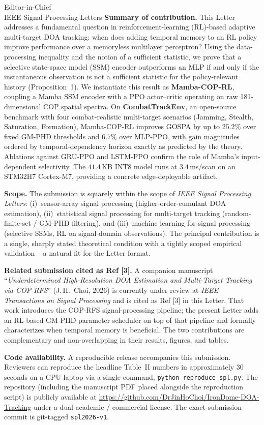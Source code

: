 \documentclass[11pt,a4paper]{letter}
\begin{document}
\begin{letter}{Editor-in-Chief\\
IEEE Signal Processing Letters}
\medskip
\textbf{Summary of contribution.}
This Letter addresses a fundamental question in reinforcement-learning
(RL)-based adaptive multi-target DOA tracking: when does adding
temporal memory to an RL policy improve performance over a memoryless
multilayer perceptron? Using the data-processing inequality and the
notion of a sufficient statistic, we prove that a selective state-space
model (SSM) encoder outperforms an MLP if and only if the instantaneous
observation is not a sufficient statistic for the policy-relevant
history (Proposition~1). We instantiate this result as
\textbf{Mamba-COP-RL}, coupling a Mamba SSM encoder with a PPO
actor--critic operating on raw 181-dimensional COP spatial spectra. On
\textbf{CombatTrackEnv}, an open-source benchmark with four
combat-realistic multi-target scenarios (Jamming, Stealth, Saturation,
Formation), Mamba-COP-RL improves GOSPA by up to $25.2\%$ over fixed
GM-PHD thresholds and $6.7\%$ over MLP-PPO, with gain magnitudes
ordered by temporal-dependency horizon exactly as predicted by the
theory. Ablations against GRU-PPO and LSTM-PPO confirm the role of
Mamba's input-dependent selectivity. The $41.4$\,KB INT8 model runs at
$3.4$\,ms/scan on an STM32H7 Cortex-M7, providing a concrete
edge-deployable artifact.

\medskip
\textbf{Scope.}
The submission is squarely within the scope of \textit{IEEE Signal
Processing Letters}: (i)~sensor-array signal processing
(higher-order-cumulant DOA estimation), (ii)~statistical signal
processing for multi-target tracking (random-finite-set / GM-PHD
filtering), and (iii)~machine learning for signal processing (selective
SSMs, RL on signal-domain observations). The principal contribution is
a single, sharply stated theoretical condition with a tightly scoped
empirical validation -- a natural fit for the Letter format.

\medskip
\textbf{Related submission cited as Ref [3].}
A companion manuscript ``\emph{Underdetermined High-Resolution DOA
Estimation and Multi-Target Tracking via COP-RFS}'' (J.\,H.\ Choi,
2026) is currently under review at \textit{IEEE Transactions on Signal
Processing} and is cited as Ref [3] in this Letter. That work
introduces the COP-RFS signal-processing pipeline; the present Letter
adds an RL-based GM-PHD parameter scheduler on top of that pipeline
and formally characterizes when temporal memory is beneficial. The
two contributions are complementary and non-overlapping in their
results, figures, and tables.

\medskip
\textbf{Code availability.}
A reproducible release accompanies this submission. Reviewers can
reproduce the headline Table~II numbers in approximately 30 seconds
on a CPU laptop via a single command, \texttt{python reproduce\_spl.py}.
The repository (including the manuscript PDF placed alongside the
reproduction script) is publicly available at
\url{https://github.com/DrJinHoChoi/IronDome-DOA-Tracking} under a
dual academic / commercial license. The exact submission commit is
git-tagged \texttt{spl2026-v1}.


\end{letter}
\end{document}
